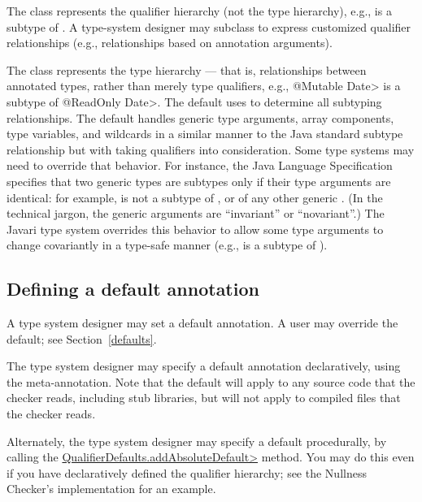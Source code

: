 The  class represents the qualifier hierarchy (not the
type hierarchy), e.g., 
is a subtype of .  A type-system designer may subclass
 to express customized qualifier
relationships (e.g., relationships based on annotation
arguments).

The  class represents the type hierarchy ---
that is, relationships between
annotated types, rather than merely type qualifiers, e.g., \<@Mutable
Date> is a subtype of \<@ReadOnly Date>.  The default  uses
 to determine all subtyping relationships.
The default  handles
generic type arguments, array components, type variables, and
wildcards in a similar manner to the Java standard subtype
relationship but with taking qualifiers into consideration.  Some type
systems may need to override that behavior.  For instance, the Java
Language Specification specifies that two generic types are subtypes only
if their type arguments are identical:  for example,
 is not a subtype of , or of any other
generic .
(In the technical jargon, the generic arguments are ``invariant'' or ``novariant''.)
The Javari type system overrides this
behavior to allow some type arguments to change covariantly in a type-safe
manner (e.g.,
 is a subtype of ).


\subsection{Defining a default annotation\label{typesystem-defaults}}


A type system designer may set a default annotation.  A user may override
the default; see Section~\ref{defaults}.

The type system designer may specify a default annotation declaratively,
using the 
meta-annotation.
Note that the default will apply to any source code that the checker reads,
including stub libraries, but will not apply to compiled 
files that the checker reads.

\begin{sloppypar}
Alternately, the type system designer may specify a default procedurally,
by calling the
\href{api/org/checkerframework/framework/util/defaults/QualifierDefaults.html#addAbsoluteDefault-javax.lang.model.element.AnnotationMirror-org.checkerframework.framework.qual.DefaultLocation-}{\<QualifierDefaults.addAbsoluteDefault>}
method.  You may do this even if you have declaratively defined the
qualifier hierarchy; see the Nullness Checker's implementation for an
example.
\end{sloppypar}


